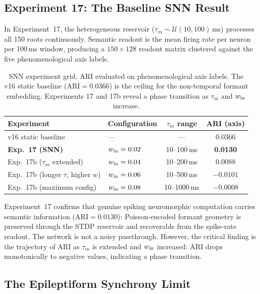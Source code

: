 \documentclass[12pt]{article}
\begin{document}
\subsection{Experiment 17: The Baseline SNN Result}

In Experiment~17, the heterogeneous reservoir ($\tau_m \sim \mathcal{U}(10,100)$\,ms) processes all 150 roots continuously. Semantic readout is the mean firing rate per neuron per 100\,ms window, producing a $150 \times 128$ readout matrix clustered against the five phenomenological axis labels.

\begin{table}[htbp]
\centering
\renewcommand{\arraystretch}{1.3}
\begin{tabular}{llcc}
\toprule
\textbf{Experiment} & \textbf{Configuration} & \textbf{$\tau_m$ range} & \textbf{ARI (axis)}\\
\midrule
v16 static baseline                  & ---                    & ---            & 0.0366\\
\textbf{Exp.~17 (SNN)}               & $w_{\rm in}=0.02$      & 10--100\,ms    & \textbf{0.0130}\\
Exp.~17b ($\tau_m$ extended)         & $w_{\rm in}=0.04$      & 10--200\,ms    & $0.0088$\\
Exp.~17b (longer $\tau$, higher $w$) & $w_{\rm in}=0.06$      & 10--500\,ms    & $-0.0101$\\
Exp.~17b (maximum config)            & $w_{\rm in}=0.08$      & 10--1000\,ms   & $-0.0008$\\
\bottomrule
\end{tabular}
\caption{SNN experiment grid. ARI evaluated on phenomenological axis labels. The v16 static baseline (ARI$=0.0366$) is the ceiling for the non-temporal formant embedding. Experiments 17 and 17b reveal a phase transition as $\tau_m$ and $w_{\rm in}$ increase.}
\end{table}

Experiment~17 confirms that genuine spiking neuromorphic computation carries semantic information (ARI$=0.0130$): Poisson-encoded formant geometry is preserved through the STDP reservoir and recoverable from the spike-rate readout. The network is not a noisy passthrough. However, the critical finding is the trajectory of ARI as $\tau_m$ is extended and $w_{\rm in}$ increased: ARI drops monotonically to negative values, indicating a phase transition.

\subsection{The Epileptiform Synchrony Limit}
\end{document}
